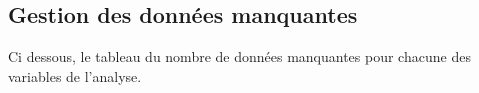 \documentclass{book}
\begin{document}
 
 
 
\subsection{Gestion des données manquantes}


\noindent
Ci dessous, le tableau du nombre de données manquantes pour chacune des variables de l'analyse.\\
\bigskip
\end{document}
